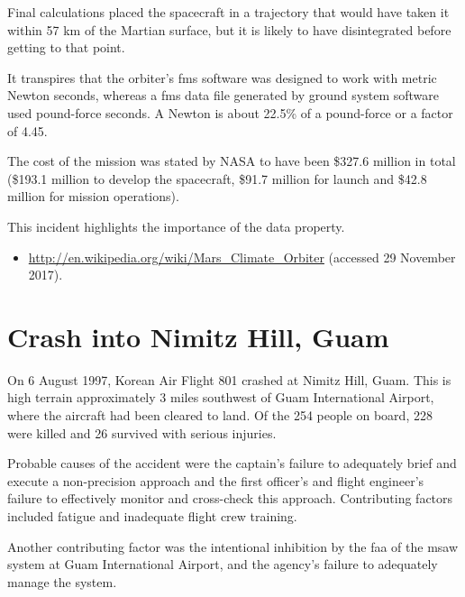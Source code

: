 Final calculations placed the spacecraft in a trajectory that would have taken it within 57 km of the Martian surface, but it is likely to have disintegrated before getting to that point. 

It transpires that the orbiter's \gls{fms} software was designed to work with metric Newton seconds, whereas a \gls{fms} data file generated by ground system software used pound-force seconds. A Newton is about 22.5\% of a pound-force or a factor of 4.45.

The cost of the mission was stated by NASA to have been \$327.6 million in total (\$193.1 million to develop the spacecraft, \$91.7 million for launch and \$42.8 million for mission operations). 

This incident highlights the importance of the  \gls{data property}.

\begin{itemize}
  \item \raggedright{\href{http://en.wikipedia.org/wiki/Mars_Climate_Orbiter}{http://en.wikipedia.org/wiki/Mars\_Climate\_Orbiter} (accessed 29 November 2017).}
\end{itemize}


\section{Crash into Nimitz Hill, Guam \label{bkm:incacc:nimitzhill}}
On 6 August 1997, Korean Air Flight 801 crashed at Nimitz Hill, Guam. This is high terrain approximately 3 miles southwest of Guam International Airport, where the aircraft had been cleared to land. Of the 254 people on board, 228 were killed and 26 survived with serious injuries.

Probable causes of the accident were the captain's failure to adequately brief and execute a non-precision approach and the first officer's and flight engineer's failure to effectively monitor and cross-check this approach. Contributing factors included fatigue and inadequate flight crew training.

Another contributing factor was the intentional inhibition by the \gls{faa} of the \gls{msaw} system at Guam International Airport, and the agency's failure to adequately manage the system.

